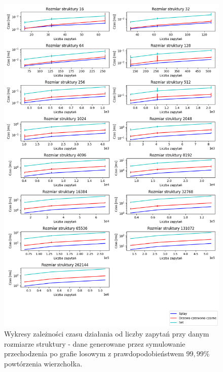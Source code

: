 \documentclass[declaration,shortabstract]{iithesis}
\theoremstyle{thm}
\theoremstyle{remark}
\theoremstyle{plain}
\theoremstyle{plain}
\theoremstyle{plain}
\begin{document}
\begin{figure}[H]  
\centering
    \includegraphics[scale=0.5]{wykresy3/randwalk001.png}
      \caption{Wykresy zależności czasu działania od liczby zapytań przy danym rozmiarze struktury - dane generowane przez symulowanie przechodzenia po grafie losowym z prawdopodobieństwem  \(99,99\%\) powtórzenia wierzchołka. }  
\end{figure}
\end{document}
